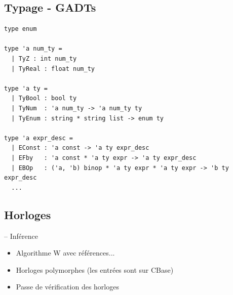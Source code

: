 \documentclass[11pt,usenames,dvipsnames]{beamer}
\newcommand{\inline}[1]{{\ttfamily #1}}
\begin{document}
\subsection{Typage - GADTs}
\begin{frame}[fragile]{\null}
  \begin{lstlisting}[language=caml]
type enum

type 'a num_ty =
  | TyZ : int num_ty
  | TyReal : float num_ty

type 'a ty =
  | TyBool : bool ty
  | TyNum  : 'a num_ty -> 'a num_ty ty
  | TyEnum : string * string list -> enum ty

type 'a expr_desc =
  | EConst : 'a const -> 'a ty expr_desc
  | EFby   : 'a const * 'a ty expr -> 'a ty expr_desc
  | EBOp   : ('a, 'b) binop * 'a ty expr * 'a ty expr -> 'b ty expr_desc
  ...
  \end{lstlisting}
\end{frame}

\subsection{Horloges}
\begin{frame}[fragile]{-- Inférence}
  \begin{itemize}
  \item Algorithme W avec références...
  \item Horloges polymorphes (les entrées sont sur \inline{CBase})
  \item Passe de vérification des horloges
  \end{itemize}
\end{frame}
\end{document}
